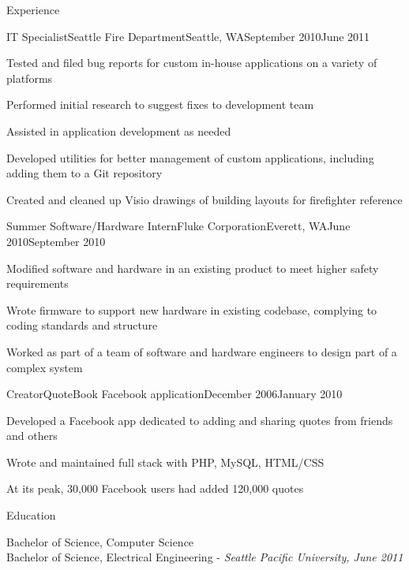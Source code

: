 \documentclass[letterpaper,10pt]{article}
\begin{document}
\begin{res_section}{Experience}
\begin{res_experienceitem}{IT Specialist}{Seattle Fire Department}{Seattle, WA}{September 2010}{June 2011}
  \item Tested and filed bug reports for custom in-house applications on a variety of platforms
  \item Performed initial research to suggest fixes to development team
  \item Assisted in application development as needed
  \item Developed utilities for better management of custom applications, including adding them to a Git repository
  \item Created and cleaned up Visio drawings of building layouts for firefighter reference
\end{res_experienceitem}
\begin{res_experienceitem}{Summer Software/Hardware Intern}{Fluke Corporation}{Everett, WA}{June 2010}{September 2010}
  \item Modified software and hardware in an existing product to meet higher safety requirements
  \item Wrote firmware to support new hardware in existing codebase, complying to coding standards and structure
  \item Worked as part of a team of software and hardware engineers to design part of a complex system
\end{res_experienceitem}
\begin{res_experienceitem}{Creator}{QuoteBook Facebook application}{}{December 2006}{January 2010}
  \item Developed a Facebook app dedicated to adding and sharing quotes from friends and others
  \item Wrote and maintained full stack with PHP, MySQL, HTML/CSS
  \item At its peak, 30,000 Facebook users had added 120,000 quotes
\end{res_experienceitem}
\end{res_section}

\begin{res_section}{Education}
\begin{res_content}{Bachelor of Science, Computer Science\\
Bachelor of Science, Electrical Engineering - \em{Seattle Pacific University, June 2011}
}
\end{res_content}
\end{res_section}
\end{document}
